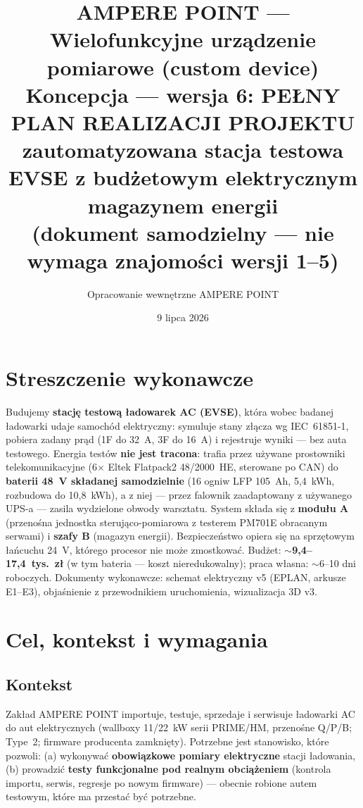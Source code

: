 \documentclass[11pt,a4paper]{article}
\title{\textbf{AMPERE POINT --- Wielofunkcyjne urządzenie pomiarowe (custom device)}\\[4pt]
\large Koncepcja --- wersja 6: PEŁNY PLAN REALIZACJI PROJEKTU\\
zautomatyzowana stacja testowa EVSE z budżetowym elektrycznym magazynem energii\\[2pt]
\normalsize (dokument samodzielny --- nie wymaga znajomości wersji 1--5)}
\author{Opracowanie wewnętrzne AMPERE POINT}
\date{9 lipca 2026}
\begin{document}
\maketitle
\vspace{-1.4em}

\section*{Streszczenie wykonawcze}
Budujemy \textbf{stację testową ładowarek AC (EVSE)}, która wobec badanej ładowarki udaje samochód
elektryczny: symuluje stany złącza wg IEC~61851-1, pobiera zadany prąd (1F do 32~A, 3F do 16~A)
i rejestruje wyniki --- bez auta testowego. Energia testów \textbf{nie jest tracona}: trafia przez
używane prostowniki telekomunikacyjne (6$\times$ Eltek Flatpack2 48/2000~HE, sterowane po CAN) do
\textbf{baterii 48~V składanej samodzielnie} (16 ogniw LFP 105~Ah, 5,4~kWh, rozbudowa do 10,8~kWh),
a z niej --- przez falownik zaadaptowany z używanego UPS-a --- zasila wydzielone obwody warsztatu.
System składa się z \textbf{modułu A} (przenośna jednostka sterująco-pomiarowa z testerem PM701E
obracanym serwami) i \textbf{szafy B} (magazyn energii). Bezpieczeństwo opiera się na sprzętowym
łańcuchu 24~V, którego procesor nie może zmostkować. Budżet: \textbf{$\sim$9,4--17,4~tys.~zł}
(w tym bateria --- koszt nieredukowalny); praca własna: $\sim$6--10 dni roboczych. Dokumenty
wykonawcze: schemat elektryczny v5 (EPLAN, arkusze E1--E3), objaśnienie z przewodnikiem
uruchomienia, wizualizacja 3D v3.

\tableofcontents

\section{Cel, kontekst i wymagania}
\subsection{Kontekst}
Zakład AMPERE POINT importuje, testuje, sprzedaje i serwisuje ładowarki AC do aut elektrycznych
(wallboxy 11/22~kW serii PRIME/HM, przenośne Q/P/B; Type~2; firmware producenta zamknięty).
Potrzebne jest stanowisko, które pozwoli: (a) wykonywać \textbf{obowiązkowe pomiary elektryczne}
stacji ładowania, (b) prowadzić \textbf{testy funkcjonalne pod realnym obciążeniem} (kontrola
importu, serwis, regresje po nowym firmware) --- obecnie robione autem testowym, które ma przestać
być potrzebne.
\end{document}
